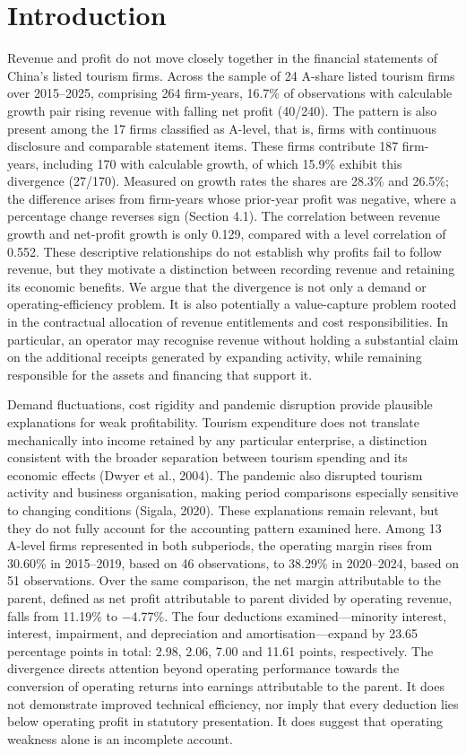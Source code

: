 \documentclass[review,3p,times]{elsarticle}
\begin{document}
\section{Introduction}

Revenue and profit do not move closely together in the financial statements of China's listed tourism firms. Across the sample of 24 A-share listed tourism firms over 2015--2025, comprising 264 firm-years, 16.7\% of observations with calculable growth pair rising revenue with falling net profit (40/240). The pattern is also present among the 17 firms classified as A-level, that is, firms with continuous disclosure and comparable statement items. These firms contribute 187 firm-years, including 170 with calculable growth, of which 15.9\% exhibit this divergence (27/170). Measured on growth rates the shares are 28.3\% and 26.5\%; the difference arises from firm-years whose prior-year profit was negative, where a percentage change reverses sign (Section 4.1). The correlation between revenue growth and net-profit growth is only 0.129, compared with a level correlation of 0.552. These descriptive relationships do not establish why profits fail to follow revenue, but they motivate a distinction between recording revenue and retaining its economic benefits. We argue that the divergence is not only a demand or operating-efficiency problem. It is also potentially a value-capture problem rooted in the contractual allocation of revenue entitlements and cost responsibilities. In particular, an operator may recognise revenue without holding a substantial claim on the additional receipts generated by expanding activity, while remaining responsible for the assets and financing that support it.

Demand fluctuations, cost rigidity and pandemic disruption provide plausible explanations for weak profitability. Tourism expenditure does not translate mechanically into income retained by any particular enterprise, a distinction consistent with the broader separation between tourism spending and its economic effects (Dwyer et al., 2004). The pandemic also disrupted tourism activity and business organisation, making period comparisons especially sensitive to changing conditions (Sigala, 2020). These explanations remain relevant, but they do not fully account for the accounting pattern examined here. Among 13 A-level firms represented in both subperiods, the operating margin rises from 30.60\% in 2015--2019, based on 46 observations, to 38.29\% in 2020--2024, based on 51 observations. Over the same comparison, the net margin attributable to the parent, defined as net profit attributable to parent divided by operating revenue, falls from 11.19\% to \ensuremath{-}4.77\%. The four deductions examined---minority interest, interest, impairment, and depreciation and amortisation---expand by 23.65 percentage points in total: 2.98, 2.06, 7.00 and 11.61 points, respectively. The divergence directs attention beyond operating performance towards the conversion of operating returns into earnings attributable to the parent. It does not demonstrate improved technical efficiency, nor imply that every deduction lies below operating profit in statutory presentation. It does suggest that operating weakness alone is an incomplete account.
\end{document}
